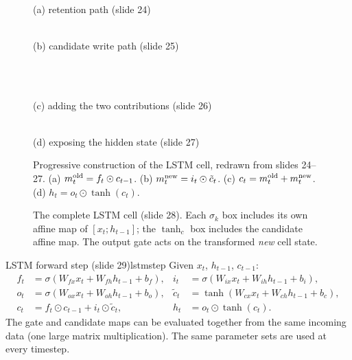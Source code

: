\documentclass[11pt,a4paper]{article}
\newcommand{\tc}{\tilde c}
\begin{document}
\begin{figure}[H]\centering
\begin{minipage}{0.49\linewidth}\centering{}\\[-1pt]{\small (a) retention path (slide 24)}\end{minipage}\hfill
\begin{minipage}{0.49\linewidth}\centering{}\\[-1pt]{\small (b) candidate write path (slide 25)}\end{minipage}\\[6pt]
\begin{minipage}{0.49\linewidth}\centering{}\\[-1pt]{\small (c) adding the two contributions (slide 26)}\end{minipage}\hfill
\begin{minipage}{0.49\linewidth}\centering{}\\[-1pt]{\small (d) exposing the hidden state (slide 27)}\end{minipage}
\caption{Progressive construction of the LSTM cell, redrawn from slides 24--27. (a) $m_t^{\rm old}=f_t\odot c_{t-1}$. (b) $m_t^{\rm new}=i_t\odot\tc_t$. (c) $c_t=m_t^{\rm old}+m_t^{\rm new}$. (d) $h_t=o_t\odot\tanh(c_t)$.}
\label{fig:lstmbuild}
\end{figure}

\begin{figure}[H]\centering
{}
\caption{The complete LSTM cell (slide 28). Each $\sigma_k$ box includes its own affine map of $[x_t;h_{t-1}]$; the $\tanh_c$ box includes the candidate affine map. The output gate acts on the transformed \emph{new} cell state.}
\label{fig:lstmfull}
\end{figure}

\begin{algorithm}{LSTM forward step (slide 29)}{lstmstep}
Given $x_t$, $h_{t-1}$, $c_{t-1}$:
\begin{align*}
f_t&=\sigma(W_{fx}x_t+W_{fh}h_{t-1}+b_f), & i_t&=\sigma(W_{ix}x_t+W_{ih}h_{t-1}+b_i),\\
o_t&=\sigma(W_{ox}x_t+W_{oh}h_{t-1}+b_o), & \tc_t&=\tanh(W_{cx}x_t+W_{ch}h_{t-1}+b_c),\\
c_t&=f_t\odot c_{t-1}+i_t\odot\tc_t, & h_t&=o_t\odot\tanh(c_t).
\end{align*}
The gate and candidate maps can be evaluated together from the same incoming data (one large matrix multiplication). The same parameter sets are used at every timestep.
\end{algorithm}
\end{document}
